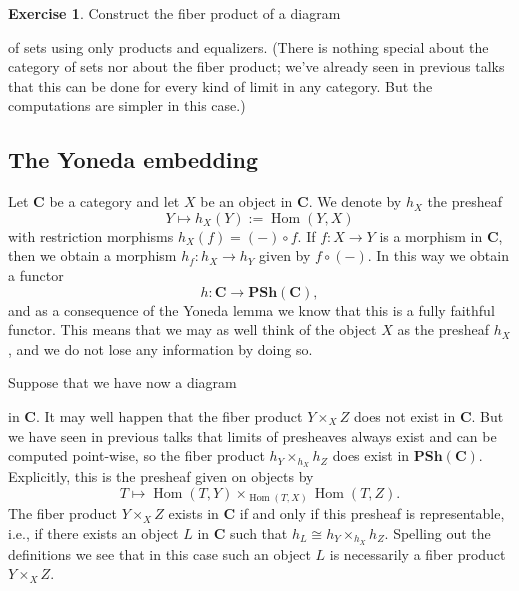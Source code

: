 \documentclass[12pt,reqno,a4paper]{amsart}
\theoremstyle{plain}
\theoremstyle{definition}
\newtheorem{xca}[thm]{Exercise}
\theoremstyle{remark}
\begin{document}
\begin{xca}
  Construct the fiber product of a diagram
  \begin{center}
  \end{center}
  of sets using only products and equalizers.
  (There is nothing special about the category of sets nor about the fiber product; we've already seen in previous talks that this can be done for every kind of limit in any category.
  But the computations are simpler in this case.)
\end{xca}

\subsection{The Yoneda embedding}

Let $\mathbf{C}$ be a category and let $X$ be an object in $\mathbf{C}$.
We denote by $h_{X}$ the presheaf
\[ Y \mapsto h_{X}(Y) := \operatorname{Hom}(Y,X) \]
with restriction morphisms $h_{X}(f) = (-) \circ f$.
If $f \colon X \to Y$ is a morphism in $\mathbf{C}$, then we obtain a morphism $h_{f} \colon h_{X} \to h_{Y}$ given by $f \circ (-)$.
In this way we obtain a functor
\[ h \colon \mathbf{C} \to \mathbf{PSh}(\mathbf{C}), \]
and as a consequence of the Yoneda lemma we know that this is a fully faithful functor.
This means that we may as well think of the object $X$ as the presheaf $h_{X}$, and we do not lose any information by doing so.

Suppose that we have now a diagram
\begin{center}
\end{center}
in $\mathbf{C}$.
It may well happen that the fiber product $Y \times_{X} Z$ does not exist in $\mathbf{C}$.
But we have seen in previous talks that limits of presheaves always exist and can be computed point-wise, so the fiber product $h_{Y} \times_{h_{X}} h_{Z}$ does exist in $\mathbf{PSh}(\mathbf{C})$.
Explicitly, this is the presheaf given on objects by
\[ T \mapsto \operatorname{Hom}(T,Y) \times_{\operatorname{Hom}(T,X)} \operatorname{Hom}(T,Z). \]
The fiber product $Y \times_{X} Z$ exists in $\mathbf{C}$ if and only if this presheaf is representable, i.e., if there exists an object $L$ in $\mathbf{C}$ such that $h_{L} \cong h_{Y} \times_{h_{X}} h_{Z}$.
Spelling out the definitions we see that in this case such an object $L$ is necessarily a fiber product $Y \times_{X} Z$.
\end{document}
